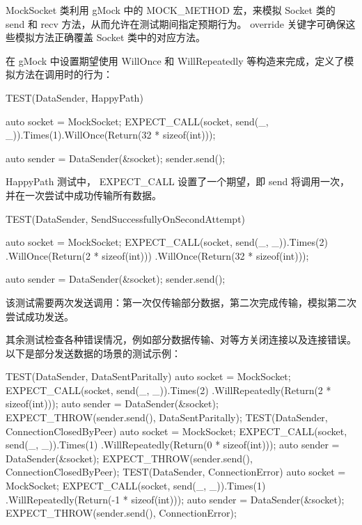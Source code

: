 MockSocket 类利用 gMock 中的 MOCK\_METHOD 宏，来模拟 Socket 类的 send 和 recv 方法，从而允许在测试期间指定预期行为。 override 关键字可确保这些模拟方法正确覆盖 Socket 类中的对应方法。

在 gMock 中设置期望使用 WillOnce 和 WillRepeatedly 等构造来完成，定义了模拟方法在调用时的行为：

\begin{cpp}
TEST(DataSender, HappyPath) {
    auto socket = MockSocket{};
    EXPECT_CALL(socket, send(_, _)).Times(1).WillOnce(Return(32 * sizeof(int)));

    auto sender = DataSender(&socket);
    sender.send();
}
\end{cpp}

HappyPath 测试中， EXPECT\_CALL 设置了一个期望，即 send 将调用一次，并在一次尝试中成功传输所有数据。

\begin{cpp}
TEST(DataSender, SendSuccessfullyOnSecondAttempt) {
    auto socket = MockSocket{};
    EXPECT_CALL(socket, send(_, _)).Times(2)
                                   .WillOnce(Return(2 * sizeof(int)))
                                   .WillOnce(Return(32 * sizeof(int)));

    auto sender = DataSender(&socket);
    sender.send();
}
\end{cpp}

该测试需要两次发送调用：第一次仅传输部分数据，第二次完成传输，模拟第二次尝试成功发送。

其余测试检查各种错误情况，例如部分数据传输、对等方关闭连接以及连接错误。以下是部分发送数据的场景的测试示例：

\begin{cpp}
TEST(DataSender, DataSentParitally) {
    auto socket = MockSocket{};
    EXPECT_CALL(socket, send(_, _)).Times(2)
                                   .WillRepeatedly(Return(2 * sizeof(int)));
    auto sender = DataSender(&socket);
    EXPECT_THROW(sender.send(), DataSentParitally);
}
TEST(DataSender, ConnectionClosedByPeer) {
    auto socket = MockSocket{};
    EXPECT_CALL(socket, send(_, _)).Times(1)
                                   .WillRepeatedly(Return(0 * sizeof(int)));
    auto sender = DataSender(&socket);
    EXPECT_THROW(sender.send(), ConnectionClosedByPeer);
}
TEST(DataSender, ConnectionError) {
    auto socket = MockSocket{};
    EXPECT_CALL(socket, send(_, _)).Times(1)
                                   .WillRepeatedly(Return(-1 * sizeof(int)));
    auto sender = DataSender(&socket);
    EXPECT_THROW(sender.send(), ConnectionError);
}
\end{cpp}

